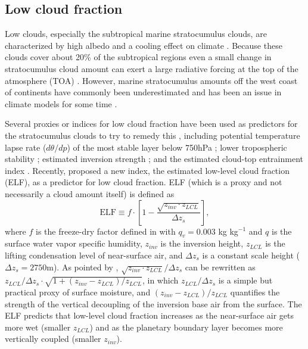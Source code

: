 \subsection{Low cloud fraction}

Low clouds, especially the subtropical marine stratocumulus clouds, are characterized by high albedo and a cooling effect on climate \citep{Hartmann1992}. Because these clouds cover about 20\% of the subtropical regions even a small change in stratocumulus cloud amount can exert a large radiative forcing at the top of the atmosphere (TOA) \citep{Slingo1990}. However, marine stratocumulus amounts off the west coast of continents have commonly been underestimated and has been an issue in climate models for some time \citep[e.g.,][]{Nam2012, Lauer2013, Dolinar2015}.

Several proxies or indices for low cloud fraction have been used as predictors for the stratocumulus clouds to try to remedy this \citep[e.g.,][]{Kawai2006, Joshi2015, Collins2004, Guo2014, Kawai2019}, including potential temperature lapse rate ($d\theta/dp$) of the most stable layer below 750hPa \citep{Slingo1987}; lower tropospheric stability \citep[LTS;][]{Klein1993}; estimated inversion strength \citep[EIS;][]{Wood2006}; and the estimated cloud-top entrainment index \citep[ECTEI;][]{Kawai2017}. Recently, \citet{Park2019} proposed a new index, the estimated low-level cloud fraction (ELF), as a predictor for low cloud fraction. ELF (which is a proxy and not necessarily a cloud amount itself) is defined as
\begin{equation}
	\text{ELF} \equiv f \cdot\left[1-\frac{\sqrt{z_{inv} \cdot z_{LCL}}}{\Delta z_{s}}\right],
	\label{eq:ELF}
\end{equation}
where $f$ is the freeze-dry factor defined in  with $q_v=0.003$ kg kg$^{-1}$ and $q$ is the surface water vapor specific humidity,  $z_{inv}$ is the inversion height, $z_{LCL}$ is the lifting condensation level of near-surface air, and $\Delta z_{s}$ is a constant scale height ($\Delta z_{s}= 2750$m). As pointed by \citet{Park2019},
$\sqrt{z_{inv} \cdot z_{LCL}}/\Delta z_{s}$ can be rewritten as $z_{LCL}/\Delta z_{s}\cdot \sqrt{1+(z_{inv} -z_{LCL})/z_{LCL}}$, in which $z_{LCL}/\Delta z_{s}$ is a simple but practical proxy of surface moisture, and $(z_{inv}-z_{LCL})/z_{LCL}$ quantifies the strength of the vertical decoupling of the inversion base air from the surface. The ELF predicts that low-level cloud fraction increases as the near-surface air gets more wet (smaller $z_{LCL}$) and as the planetary boundary layer becomes more vertically coupled (smaller $z_{inv}$).

